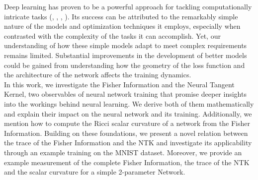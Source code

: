 Deep learning has proven to be a powerful approach for tackling computationally intricate tasks (\cite{DeepLearning:DNA}, \cite{DeepLearning:DrugRecognition}, \cite{DeepLearning:ImageNetClassification}, \cite{DeepLearning:Translation}). Its success can be attributed to the remarkably simple nature of the models and optimization techniques it employs, especially when contrasted with the complexity of the tasks it can accomplish. Yet, our understanding of how these simple models adapt to meet complex requirements remains limited. Substantial improvements in the development of better models could be gained from understanding how the geometry of the loss function and the architecture of the network affects the training dynamics.\\
In this work, we investigate the Fisher Information and the Neural Tangent Kernel, two observables of neural network training that promise deeper insights into the workings behind neural learning. We derive both of them mathematically and explain their impact on the neural network and its training. Additionally, we mention how to compute the Ricci scalar curvature of a network from the Fisher Information. Building on these foundations, we present a novel relation between the trace of the Fisher Information and the NTK and investigate its applicability through an example training on the MNIST dataset. Moreover, we provide an example measurement of the complete Fisher Information, the trace of the NTK and the scalar curvature for a simple 2-parameter Network.
